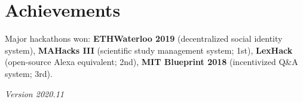 \documentclass[letterpaper,11pt]{article}
\begin{document}
\section{Achievements}

Major hackathons won: \textbf{ETHWaterloo 2019} (decentralized social identity
system), \textbf{MAHacks III} (scientific study management system; 1st), \textbf{LexHack}
(open-source Alexa equivalent; 2nd), \textbf{MIT Blueprint 2018} (incentivized
Q\&A system; 3rd).

\begin{flushright}
     \textit{Version 2020.11}
\end{flushright}
\end{document}
